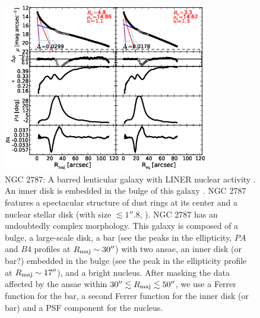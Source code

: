 \documentclass[preprint2]{emulateapj}
\newcommand{\fitfigurewidth}{0.8\textwidth}
\begin{document}
  \begin{figure}[h]
  \begin{center}
  \includegraphics[width=\fitfigurewidth]{images/n2787_1Dfit.eps}
  \caption{NGC 2787: 
  A barred lenticular galaxy with LINER nuclear activity \citep{veroncettyveron2006}.
  An inner disk is embedded in the bulge of this galaxy \citep{erwin2003n2787}.
  NGC 2787 features a spectacular structure of dust rings at its center \citep{erwinsparke2003}
  and a nuclear stellar disk (with size $\lesssim 1''.8$, \citealt{ledo2010}).
  NGC 2787 has an undoubtedly complex morphology. 
  This galaxy is composed of a bulge, a large-scale disk, a bar (see the peaks in the ellipticity, $PA$ and $B4$ profiles
  at $R_{\rm maj} \sim 30''$) with two ansae, an inner disk (or bar?) embedded in the bulge (see the peak in the ellipticity profile
  at $R_{\rm maj} \sim 17''$), and a bright nucleus.
  After masking the data affected by the ansae within $30'' \lesssim R_{\rm maj} \lesssim 50''$,
  we use a Ferrer function for the bar, a second Ferrer function for the inner disk (or bar) 
  and a PSF component for the nucleus. 
}
\end{center}
\end{figure}
\end{document}
